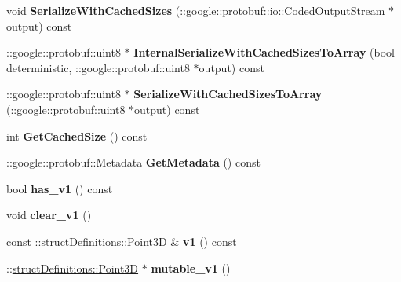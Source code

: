 \begin{DoxyCompactItemize}
void {\bfseries Serialize\+With\+Cached\+Sizes} (\+::google\+::protobuf\+::io\+::\+Coded\+Output\+Stream $\ast$output) const
\item 
\hypertarget{classstruct_definitions_1_1_triangle_face_a63d0f84210102d831b8c1f8483967ded}{}\label{classstruct_definitions_1_1_triangle_face_a63d0f84210102d831b8c1f8483967ded} 
\+::google\+::protobuf\+::uint8 $\ast$ {\bfseries Internal\+Serialize\+With\+Cached\+Sizes\+To\+Array} (bool deterministic, \+::google\+::protobuf\+::uint8 $\ast$output) const
\item 
\hypertarget{classstruct_definitions_1_1_triangle_face_afe104b0a4e5215e6d6890afef3a35d6a}{}\label{classstruct_definitions_1_1_triangle_face_afe104b0a4e5215e6d6890afef3a35d6a} 
\+::google\+::protobuf\+::uint8 $\ast$ {\bfseries Serialize\+With\+Cached\+Sizes\+To\+Array} (\+::google\+::protobuf\+::uint8 $\ast$output) const
\item 
\hypertarget{classstruct_definitions_1_1_triangle_face_acc6573be3303eb866d6a020eedb6bb86}{}\label{classstruct_definitions_1_1_triangle_face_acc6573be3303eb866d6a020eedb6bb86} 
int {\bfseries Get\+Cached\+Size} () const
\item 
\hypertarget{classstruct_definitions_1_1_triangle_face_ad43242b2b318c305fda87c7b300c58be}{}\label{classstruct_definitions_1_1_triangle_face_ad43242b2b318c305fda87c7b300c58be} 
\+::google\+::protobuf\+::\+Metadata {\bfseries Get\+Metadata} () const
\item 
\hypertarget{classstruct_definitions_1_1_triangle_face_a7476ff549f82759eb2d77a71c27191e6}{}\label{classstruct_definitions_1_1_triangle_face_a7476ff549f82759eb2d77a71c27191e6} 
bool {\bfseries has\+\_\+v1} () const
\item 
\hypertarget{classstruct_definitions_1_1_triangle_face_ac5e0aba231002507cbb9e563d9806b60}{}\label{classstruct_definitions_1_1_triangle_face_ac5e0aba231002507cbb9e563d9806b60} 
void {\bfseries clear\+\_\+v1} ()
\item 
\hypertarget{classstruct_definitions_1_1_triangle_face_abc36ef28c16727664cdae7b8fdbfe15c}{}\label{classstruct_definitions_1_1_triangle_face_abc36ef28c16727664cdae7b8fdbfe15c} 
const \+::\hyperlink{classstruct_definitions_1_1_point3_d}{struct\+Definitions\+::\+Point3D} \& {\bfseries v1} () const
\item 
\hypertarget{classstruct_definitions_1_1_triangle_face_a975b3278f569ff2cc7be4d2b7da8ccc2}{}\label{classstruct_definitions_1_1_triangle_face_a975b3278f569ff2cc7be4d2b7da8ccc2} 
\+::\hyperlink{classstruct_definitions_1_1_point3_d}{struct\+Definitions\+::\+Point3D} $\ast$ {\bfseries mutable\+\_\+v1} ()

\end{DoxyCompactItemize}
